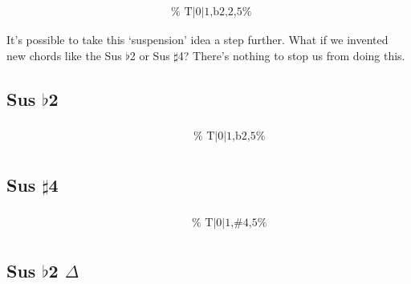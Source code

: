 \documentclass[english]{./gbook}
\begin{document}
\begin{large}
\[\begin{array}{ll}
&
	\text{
	}
\end{array}
\]

It's possible to take this `suspension' idea a step further. What if we invented new chords like the Sus $\flat$2 or Sus $\sharp$4? There's nothing to stop us from doing this.

\subsection*{Sus $\flat$2}

\[
\begin{array}{ll}
	\begin{array}{c}
		\begin{array}{ccc}
			&%
			&%
		\end{array}
		\\
		\begin{array}{cc}
			&%
		\end{array}
	\end{array}

&
	\text{
	}
\end{array}
\]

\subsection*{Sus $\sharp$4}

\[
\begin{array}{ll}
	\begin{array}{c}
		\begin{array}{ccc}
			&%
			&%
		\end{array}
		\\
		\begin{array}{cc}
			&%
		\end{array}
	\end{array}

&
	\text{
	}
\end{array}
\]

\subsection*{Sus $\flat$2 $\Delta$}

\[
\begin{array}{ll}
	\begin{array}{c}
		\begin{array}{ccc}
			&%
			&%
		\end{array}
		\\
		\begin{array}{cc}
			&%
		\end{array}
	\end{array}


\end{array}\]
\end{large}
\end{document}
